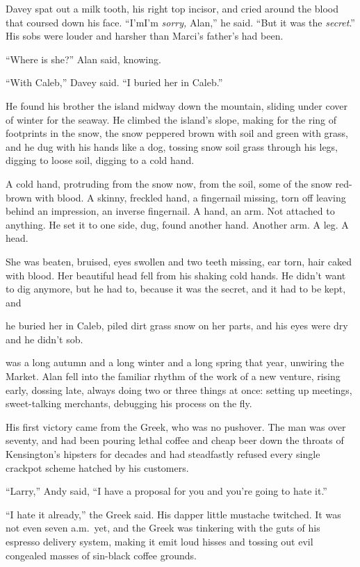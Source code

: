 Davey spat out a milk tooth, his right top incisor, and cried around
the blood that coursed down his face.  ``I'm\dash{}I'm \textit{sorry,}
Alan,'' he said.  ``But it was the \textit{secret}.'' His sobs were
louder and harsher than Marci's father's had been.

``Where is she?'' Alan said, knowing.

``With Caleb,'' Davey said.  ``I buried her in Caleb.''

He found his brother the island midway down the mountain, sliding
under cover of winter for the seaway.  He climbed the island's slope,
making for the ring of footprints in the snow, the snow peppered brown
with soil and green with grass, and he dug with his hands like a dog,
tossing snow soil grass through his legs, digging to loose soil,
digging to a cold hand.

A cold hand, protruding from the snow now, from the soil, some of the
snow red-brown with blood.  A skinny, freckled hand, a fingernail
missing, torn off leaving behind an impression, an inverse fingernail. 
A hand, an arm.  Not attached to anything.  He set it to one side,
dug, found another hand.  Another arm.  A leg.  A head.

She was beaten, bruised, eyes swollen and two teeth missing, ear torn,
hair caked with blood.  Her beautiful head fell from his shaking cold
hands.  He didn't want to dig anymore, but he had to, because it was
the secret, and it had to be kept, and\dash{}

\dash{}he buried her in Caleb, piled dirt grass snow on her parts, and his
eyes were dry and he didn't sob.

 was a long autumn and a long winter and a long spring that year,
unwiring the Market.  Alan fell into the familiar rhythm of the work
of a new venture, rising early, dossing late, always doing two or
three things at once:  setting up meetings, sweet-talking merchants,
debugging his process on the fly.

His first victory came from the Greek, who was no pushover.  The man
was over seventy, and had been pouring lethal coffee and cheap beer
down the throats of Kensington's hipsters for decades and had
steadfastly refused every single crackpot scheme hatched by his
customers.

``Larry,'' Andy said, ``I have a proposal for you and you're going to
hate it.''

``I hate it already,'' the Greek said.  His dapper little mustache
twitched.  It was not even seven a.m.\  yet, and the Greek was
tinkering with the guts of his espresso delivery system, making it
emit loud hisses and tossing out evil congealed masses of sin-black
coffee grounds.

